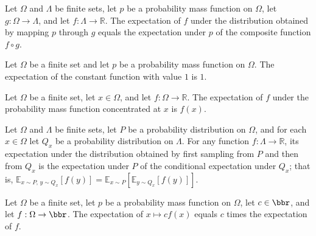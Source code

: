 \begin{theorem}
\label{FABL.pmfExpectation_map}
\leanok
{}
Let $\Omega$ and $\Lambda$ be finite sets, let $p$ be a probability mass function on
$\Omega$, let $g:\Omega\to\Lambda$, and let $f:\Lambda\to\mathbb{R}$. The expectation of
$f$ under the distribution obtained by mapping $p$ through $g$ equals the expectation
under $p$ of the composite function $f\circ g$.
\end{theorem}

\begin{theorem}
\label{FABL.pmfExpectation_const_one}
\leanok
{}
Let $\Omega$ be a finite set and let $p$ be a probability mass function on $\Omega$. The
expectation of the constant function with value $1$ is $1$.
\end{theorem}

\begin{theorem}
\label{FABL.pmfExpectation_pure}
\leanok
{}
Let $\Omega$ be a finite set, let $x\in\Omega$, and let $f:\Omega\to\mathbb{R}$. The
expectation of $f$ under the probability mass function concentrated at $x$ is $f(x)$.
\end{theorem}

\begin{theorem}
\label{FABL.pmfExpectation_bind}
\leanok
{}
Let $\Omega$ and $\Lambda$ be finite sets, let $P$ be a probability distribution on
$\Omega$, and for each $x\in\Omega$ let $Q_x$ be a probability distribution on
$\Lambda$. For any function $f:\Lambda\to\mathbb{R}$, its expectation under the
distribution obtained by first sampling from $P$ and then from $Q_x$ is the expectation
under $P$ of the conditional expectation under $Q_x$; that is, $\mathbb{E}_{x\sim
P,\,y\sim Q_x}[f(y)]=\mathbb{E}_{x\sim P}[\mathbb{E}_{y\sim Q_x}[f(y)]]$.
\end{theorem}

\begin{theorem}
\label{FABL.pmfExpectation_const_mul}
\leanok
{}
Let $\Omega$ be a finite set, let $p$ be a probability mass function on $\Omega$, let
$c\in\bbr$, and let $f:\Omega\to\bbr$. The expectation of $x\mapsto c f(x)$ equals $c$
times the expectation of $f$.
\end{theorem}

